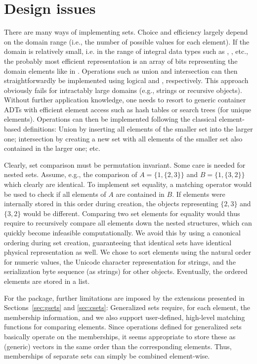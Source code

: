 \documentclass[article]{jss}
\begin{document}
\section{Design issues}
\label{sec:design}

There are many ways of implementing sets. Choice and efficiency largely
depend on the domain range (i.e., the number of possible values for each
element). If the domain is relatively small, i.e. in the range of integral
data types such as , ,  etc., the
probably most efficient representation is an array of bits
representing the domain elements like in 
\citep{sets:wirth:1983}.
Operations such as union and
intersection can then straightforwardly be implemented
using logical  and , respectively.
This approach obviously fails for intractably large domains
(e.g., strings or recursive objects). Without
further application knowledge, one needs to resort to generic
container ADTs with efficient element access such as hash tables or
search trees (for unique elements).
Operations can then be implemented following the classical
element-based definitions: Union by
inserting all elements of the smaller set into the
larger one; intersection by creating a new set with
all elements of the smaller set also contained in the larger one;
etc.

Clearly, set comparison must be permutation invariant.
Some care is needed for nested sets. Assume, e.g., the comparison of
$A = \{1, \{2, 3\}\}$ and $B = \{1, \{3, 2\}\}$ which clearly are identical.
To implement set equality, a matching operator would be used to
check if all elements of $A$ are
contained in $B$. If elements were internally stored in this order during
creation, the objects representing
$\{2, 3\}$ and $\{3, 2\}$ would be different. Comparing two set elements
for equality would thus require to recursively compare all elements
down the nested structures, which can quickly become infeasible
computationally.
We avoid this by using a canonical ordering during set creation,
guaranteeing that identical sets have identical
physical representation as well. We chose to sort
elements using the natural order for numeric values, the
Unicode character representation for strings, and the serialization
byte sequence (as strings) for other objects.
Eventually, the ordered elements are stored in a list.

For the  package, further limitations are imposed by the
extensions presented in Sections~\ref{sec:gsets} and
\ref{sec:csets}: Generalized sets require, for each element,
the membership information, and we also support user-defined, high-level
matching functions for comparing elements. Since operations defined
for generalized sets basically operate on the memberships,
it seems appropriate to store these as (generic) vectors in the same
order than the corresponding elements.
Thus, memberships of
separate sets can simply be combined element-wise.
\end{document}
